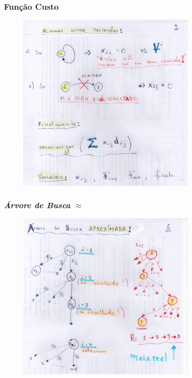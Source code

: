 \documentclass{beamer}
\begin{document}
\begin{frame}
	\frametitle{Função Custo}
	
	\begin{figure}[ht!]
		\centering
		\includegraphics[width=0.8\textwidth , height=0.8\textheight]{14_funcao_custo.pdf}
	\end{figure}
	
\end{frame}


\begin{frame}
	\frametitle{\textit{Árvore de Busca} $\approx$ }
	
	\begin{figure}[ht!]
		\centering
		\includegraphics[width=0.8\textwidth , height=0.8\textheight]{15_arv_de_busca.pdf}
	\end{figure}
	
\end{frame}
\end{document}

